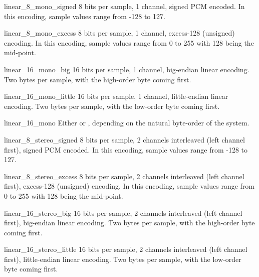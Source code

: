 \begin{datadesc}{linear_8_mono_signed}
8 bits per sample, 1 channel, signed PCM encoded.  In this encoding,
sample values range from -128 to 127.
\end{datadesc}

\begin{datadesc}{linear_8_mono_excess}
8 bits per sample, 1 channel, excess-128 (unsigned) encoding.  In this
encoding, sample values range from 0 to 255 with 128 being the
mid-point.
\end{datadesc}

\begin{datadesc}{linear_16_mono_big}
16 bits per sample, 1 channel, big-endian linear encoding.  Two bytes
per sample, with the high-order byte coming first.
\end{datadesc}

\begin{datadesc}{linear_16_mono_little}
16 bits per sample, 1 channel, little-endian linear encoding.  Two
bytes per sample, with the low-order byte coming first.
\end{datadesc}

\begin{datadesc}{linear_16_mono}
Either  or ,
depending on the natural byte-order of the system.
\end{datadesc}

\begin{datadesc}{linear_8_stereo_signed}
8 bits per sample, 2 channels interleaved (left channel first), signed
PCM encoded.  In this encoding, sample values range from -128 to 127.
\end{datadesc}

\begin{datadesc}{linear_8_stereo_excess}
8 bits per sample, 2 channels interleaved (left channel first),
excess-128 (unsigned) encoding.  In this encoding, sample values range
from 0 to 255 with 128 being the mid-point.
\end{datadesc}

\begin{datadesc}{linear_16_stereo_big}
16 bits per sample, 2 channels interleaved (left channel first),
big-endian linear encoding.  Two bytes per sample, with the high-order
byte coming first.
\end{datadesc}

\begin{datadesc}{linear_16_stereo_little}
16 bits per sample, 2 channels interleaved (left channel first),
little-endian linear encoding.  Two bytes per sample, with the
low-order byte coming first.
\end{datadesc}

